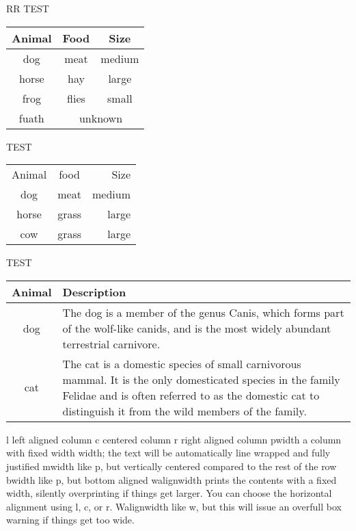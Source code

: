 \documentclass{article}
\begin{document}
RR
TEST

\begin{tabular}{ccc}
    \toprule
    Animal & Food  & Size   \\
    \midrule
    dog    & meat  & medium \\
    horse  & hay   & large  \\
    frog   & flies & small  \\
    fuath  & \multicolumn{2}{c}{unknown} \\
    \bottomrule
\end{tabular}

TEST

\begin{tabular}{*{2}c*{1}r} %
    Animal & food & Size \\
    dog & meat & medium \\ 
    horse & grass & large \\ 
    cow & grass & large \\
\end{tabular}

TEST

\begin{tabular}{cp{5cm}}
    \toprule
    Animal & Description \\
    \midrule
    dog    & The dog is a member of the genus Canis, which forms part of the
    wolf-like canids, and is the most widely abundant terrestrial
    carnivore. \\
    \addlinespace
    cat    & The cat is a domestic species of small carnivorous mammal. It is the
    only domesticated species in the family Felidae and is often referred
    to as the domestic cat to distinguish it from the wild members of the
    family. \\
    \bottomrule
\end{tabular}

l	left aligned column
c	centered column
r	right aligned column
p{width}	a column with fixed width width; the text will be automatically line wrapped and fully justified
m{width}	like p, but vertically centered compared to the rest of the row
b{width}	like p, but bottom aligned
w{align}{width}	prints the contents with a fixed width, silently overprinting if things get larger. You can choose the horizontal alignment using l, c, or r.
W{align}{width}	like w, but this will issue an overfull box warning if things get too wide.
\end{document}
